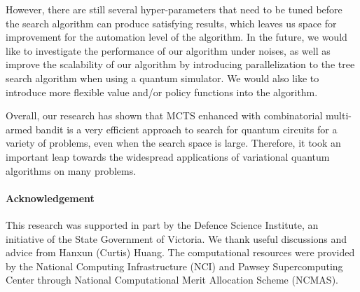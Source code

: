 \documentclass[a4paper,onecolumn,11pt]{quantumarticle}
\begin{document}
However, there are still several hyper-parameters that need to be tuned before the search algorithm can produce satisfying results, which leaves us space for improvement for the automation level of the algorithm. In the future, we would like to investigate the performance of our algorithm under noises, as well as improve the scalability of our algorithm by introducing parallelization to the tree search algorithm when using a quantum simulator. We would also like to introduce more flexible value and/or policy functions into the algorithm.

Overall, our research has shown that MCTS enhanced with combinatorial multi-armed bandit is a very efficient approach to search for quantum circuits for a variety of problems, even when the search space is large. Therefore, it took an important leap towards the widespread applications of variational quantum algorithms on many problems.

\paragraph{Acknowledgement} This research was supported in part by the Defence Science Institute, an initiative of the State Government of Victoria. We thank useful discussions and advice from Hanxun (Curtis) Huang. The computational resources were provided by the National Computing Infrastructure (NCI) and Pawsey Supercomputing Center through National Computational Merit Allocation Scheme (NCMAS).






\typeout{} 

\end{document}
